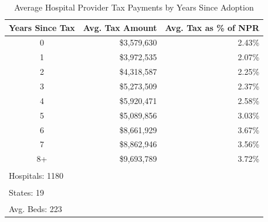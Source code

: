 \begin{table}[!h]
\centering
\caption{Average Hospital Provider Tax Payments by Years Since Adoption}
\centering
\begin{tabular}[t]{crr}
\toprule
Years Since Tax & Avg. Tax Amount & Avg. Tax as \% of NPR\\
\midrule
0 & \$3,579,630 & 2.43\%\\
1 & \$3,972,535 & 2.07\%\\
2 & \$4,318,587 & 2.25\%\\
3 & \$5,273,509 & 2.37\%\\
4 & \$5,920,471 & 2.58\%\\
5 & \$5,089,856 & 3.03\%\\
6 & \$8,661,929 & 3.67\%\\
7 & \$8,862,946 & 3.56\%\\
\midrule
8+ & \$9,693,789 & 3.72\%\\
\bottomrule
\multicolumn{3}{l}{\textsuperscript{} Hospitals: 1180}\\
\multicolumn{3}{l}{\textsuperscript{} States: 19}\\
\multicolumn{3}{l}{\textsuperscript{} Avg. Beds: 223}\\
\end{tabular}
\end{table}
